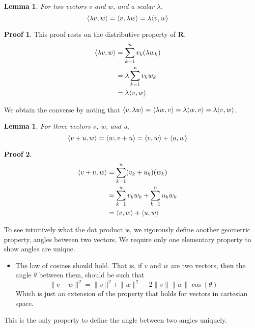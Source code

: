 \documentclass[12pt]{amsbook}
\theoremstyle{plain}
\newtheorem{lemma}[theorem]{Lemma}
\theoremstyle{definition}
\newtheorem*{prf}{Proof}
\DeclarePairedDelimiter{\inner}{\langle}{\rangle}
\begin{document}
\begin{lemma}
  For two vectors $v$ and $w$, and a scalar $\lambda$,
  \[ \inner{\lambda v, w} = \inner{v, \lambda w} = \lambda \inner{v, w} \]
\end{lemma}
\begin{prf}
  This proof rests on the distributive property of $\mathbf{R}$.
  \begin{align*}
    \inner{\lambda v, w} &= \sum_{k = 1}^n v_k (\lambda w_k)\\
                         &= \lambda \sum_{k = 1}^n v_k w_k\\
                         &= \lambda \inner{v, w}
  \end{align*}

  We obtain the converse by noting that $\inner{v, \lambda w} = \inner{\lambda w, v} = \lambda \inner{w, v} = \lambda \inner{v, w}$.
\end{prf}

\begin{lemma}
  For three vectors $v$, $w$, and $u$,
  \[ \inner{v + u, w} = \inner{w, v + u} = \inner{v,w} + \inner{u,w}  \]
\end{lemma}
\begin{prf}
  \begin{align*}
    \inner{v + u, w} &= \sum_{k = 1}^n (v_k + u_k)(w_k)\\
                     &= \sum_{k = 1}^n v_kw_k + \sum_{k = 1}^n u_kw_k\\
                     &= \inner{v,w} + \inner{u,w}
  \end{align*}
\end{prf}

To see intuitively what the dot product is, we rigorously define another geometric property, angles between two vectors. We require only one elementary property to show angles are unique.
%
\begin{itemize}
  \item The law of cosines should hold. That is, if $v$ and $w$ are two vectors, then the angle $\theta$ between them, should be such that
  \[ \|v - w\|^2 = \| v \|^2 + \| w \|^2 - 2\|v\|\|w\| \cos(\theta) \]
  Which is just an extension of the property that holds for vectors in cartesian space.
\end{itemize}
%
This is the only property to define the angle between two angles uniquely.
\end{document}
